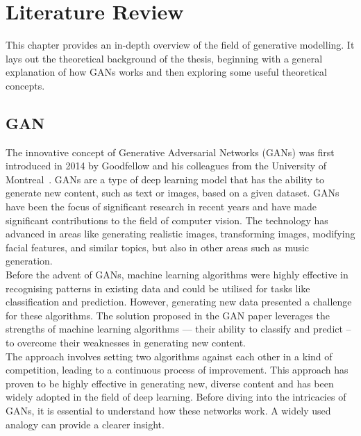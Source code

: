 \newpage
\section{Literature Review}
\label{section:literatureReviewChapter}
This chapter provides an in-depth overview of the field of generative modelling. It lays out the theoretical background of the thesis, beginning with a general explanation of how GANs works and then exploring some useful theoretical concepts.

\subsection{GAN}
The innovative concept of Generative Adversarial Networks (GANs) was first introduced in 2014 by Goodfellow and his colleagues from the University of Montreal~\cite{GANGoodfellow}. GANs are a type of deep learning model that has the ability to generate new content, such as text or images, based on a given dataset. GANs have been the focus of significant research in recent years and have made significant contributions to the field of computer vision. The technology has advanced in areas like generating realistic images, transforming images, modifying facial features, and similar topics, but also in other areas such as music generation.\\
Before the advent of GANs, machine learning algorithms were highly effective in recognising patterns in existing data and could be utilised for tasks like classification and prediction. However, generating new data presented a challenge for these algorithms. The solution proposed in the GAN paper leverages the strengths of machine learning algorithms — their ability to classify and predict – to overcome their weaknesses in generating new content.\\
The approach involves setting two algorithms against each other in a kind of competition, leading to a continuous process of improvement. This approach has proven to be highly effective in generating new, diverse content and has been widely adopted in the field of deep learning.
Before diving into the intricacies of GANs, it is essential to understand how these networks work. A widely used analogy can provide a clearer insight.\\
\\
